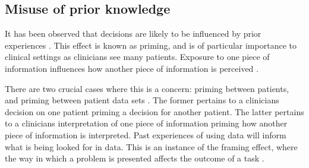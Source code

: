 \documentclass{chi-ext}
\begin{document}



\subsection{Misuse of prior knowledge}

  It has been observed that decisions are likely to be influenced by prior experiences \cite{Reay2013}. This effect is known as priming, and is of particular importance to clinical settings as clinicians see many patients. Exposure to one piece of information influences how another piece of information is perceived \cite{Kahneman2012}. 

  There are two crucial cases where this is a concern: priming between patients, and priming between patient data sets \cite{Croskerry2002}. The former pertains to a clinicians decision on one patient priming a decision for another patient. The latter pertains to a clinicians interpretation of one piece of information priming how another piece of information is interpreted. Past experiences of using data will inform what is being looked for in data. This is an instance of the framing effect, where the way in which a problem is presented affects the outcome of a task \cite{Kahneman2012}.



\end{document}

